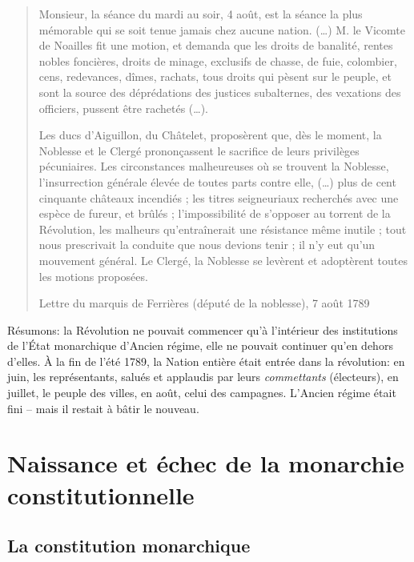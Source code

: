 \documentclass[
  french,
  letterpaper,
  DIV=11,
  numbers=noendperiod]{scrartcl}
\begin{document}
\begin{quote}
Monsieur, la séance du mardi au soir, 4 août, est la séance la plus
mémorable qui se soit tenue jamais chez aucune nation. (\ldots) M. le
Vicomte de Noailles fit une motion, et demanda que les droits de
banalité, rentes nobles foncières, droits de minage, exclusifs de
chasse, de fuie, colombier, cens, redevances, dîmes, rachats, tous
droits qui pèsent sur le peuple, et sont la source des déprédations des
justices subalternes, des vexations des officiers, pussent être rachetés
(\ldots).

Les ducs d'Aiguillon, du Châtelet, proposèrent que, dès le moment, la
Noblesse et le Clergé prononçassent le sacrifice de leurs privilèges
pécuniaires. Les circonstances malheureuses où se trouvent la Noblesse,
l'insurrection générale élevée de toutes parts contre elle, (\ldots)
plus de cent cinquante châteaux incendiés ; les titres seigneuriaux
recherchés avec une espèce de fureur, et brûlés ; l'impossibilité de
s'opposer au torrent de la Révolution, les malheurs qu'entraînerait une
résistance même inutile ; tout nous prescrivait la conduite que nous
devions tenir ; il n'y eut qu'un mouvement général. Le Clergé, la
Noblesse se levèrent et adoptèrent toutes les motions proposées.

Lettre du marquis de Ferrières (député de la noblesse), 7 août 1789
\end{quote}

Résumons: la Révolution ne pouvait commencer qu'à l'intérieur des
institutions de l'État monarchique d'Ancien régime, elle ne pouvait
continuer qu'en dehors d'elles. À la fin de l'été 1789, la Nation
entière était entrée dans la révolution: en juin, les représentants,
salués et applaudis par leurs \emph{commettants} (électeurs), en
juillet, le peuple des villes, en août, celui des campagnes. L'Ancien
régime était fini -- mais il restait à bâtir le nouveau.

\section{Naissance et échec de la monarchie
constitutionnelle}\label{naissance-et-uxe9chec-de-la-monarchie-constitutionnelle}

\subsection{La constitution
monarchique}\label{la-constitution-monarchique}
\end{document}
